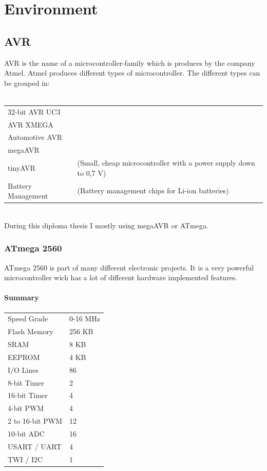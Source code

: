 \documentclass[english, 10pt]{report}
\begin{document}
\tableofcontents

\chapter{Environment}
\section{AVR}
AVR is the name of a microcontroller-family which is produces by the company Atmel.
Atmel produces different types of microcontroller.
The different types can be grouped in:\\
\\
\begin{tabular}{ll}
32-bit AVR UC3		&										\\
AVR XMEGA			&										\\
Automotive AVR		&										\\
megaAVR			& 										\\
tinyAVR			& (Small, cheap microcontroller with a power supply down to 0,7 V)\\
Battery Management	& (Battery management chips for Li-ion batteries)			\\
\end{tabular}
\\
During this diploma thesis I mostly using megaAVR or ATmega.

\subsection{ATmega 2560}
ATmega 2560 is part of many different electronic projects.
It is a very powerful microcontroller wich has a lot of different hardware implemented features.
\subsubsection{Summary}
\begin{tabular}{ll}
Speed Grade		& 0-16 MHz	\\
Flash Memory	& 256 KB	\\
SRAM			& 8 KB		\\
EEPROM		& 4 KB		\\
I/O Lines		& 86		\\
8-bit Timer		& 2		\\
16-bit Timer		& 4		\\
4-bit PWM		& 4		\\
2 to 16-bit PWM	& 12		\\
10-bit ADC		& 16		\\
USART / UART	& 4		\\
TWI / I2C		& 1		\\
\end{tabular}
\end{document}
